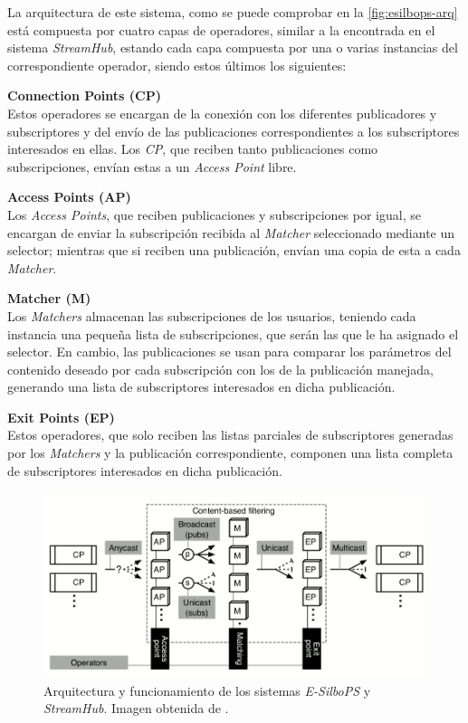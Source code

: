 La arquitectura de este sistema, como se puede comprobar en la \autoref{fig:esilbops-arq} está 
compuesta por cuatro capas de operadores, similar a la encontrada en el sistema 
\textit{StreamHub}\cite{paper:streamhub}, estando cada capa compuesta por una o varias instancias
del correspondiente operador, siendo estos últimos los siguientes:

\textbf{Connection Points (CP)}\\
Estos operadores se encargan de la conexión con los diferentes publicadores y subscriptores y del envío
de las publicaciones correspondientes a los subscriptores interesados en ellas. Los \textit{CP}, que
reciben tanto publicaciones como subscripciones, envían estas a un \textit{Access Point} libre.

\textbf{Access Points (AP)}\\
Los \textit{Access Points}, que reciben publicaciones y subscripciones por igual, se encargan de enviar
la subscripción recibida al \textit{Matcher} seleccionado mediante un selector; mientras que si reciben
una publicación, envían una copia de esta a cada \textit{Matcher}.

\textbf{Matcher (M)}\\
Los \textit{Matchers} almacenan las subscripciones de los usuarios, teniendo cada instancia una pequeña
lista de subscripciones, que serán las que le ha asignado el selector. En cambio, las publicaciones se usan
para comparar los parámetros del contenido deseado por cada subscripción con los de la publicación manejada,
generando una lista de subscriptores interesados en dicha publicación.

\textbf{Exit Points (EP)}\\
Estos operadores, que solo reciben las listas parciales de subscriptores generadas por los \textit{Matchers}
y la publicación correspondiente, componen una lista completa de subscriptores interesados en dicha 
publicación.

\begin{figure}[htpb]
    \centering
    \includegraphics[width=\textwidth]{images/streamhub-arq.png}
    \caption{Arquitectura y funcionamiento de los sistemas \textit{E-SilboPS} y \textit{StreamHub}. Imagen obtenida de \cite{paper:e-streamhub}.}
    \label{fig:esilbops-arq}
\end{figure}

